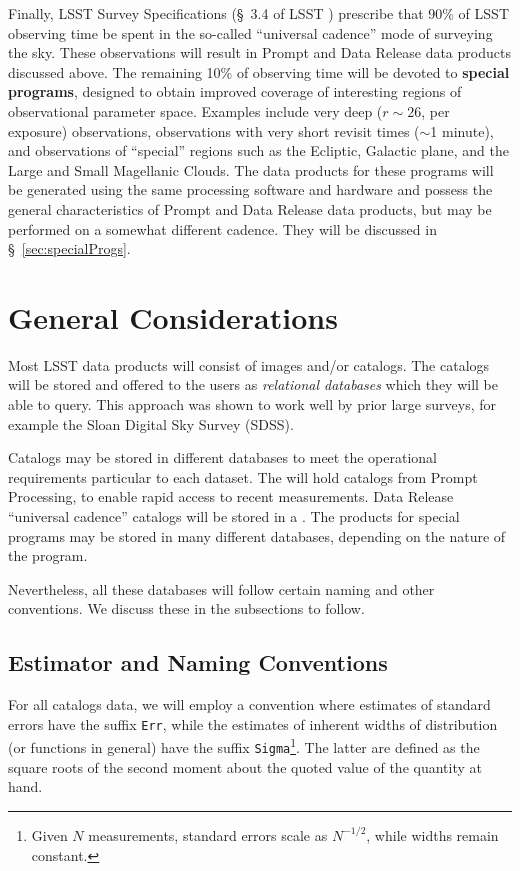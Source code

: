 Finally, LSST Survey Specifications (\S~3.4 of LSST \SRD) prescribe that 90\% of LSST observing time be spent in the so-called ``universal cadence'' mode of surveying the sky. These observations will result in Prompt and Data Release data products discussed above. The remaining 10\% of observing time will be devoted to \textbf{special programs}, designed to obtain improved coverage of interesting regions of observational parameter space. Examples include very deep ($r\sim26$, per exposure) observations, observations with very short revisit times ($\sim$1 minute), and observations of ``special'' regions such as the Ecliptic, Galactic plane, and the Large and Small Magellanic Clouds. The data products for these programs will be generated using the same processing software and hardware and possess the general characteristics of Prompt and Data Release data products, but may be performed on a somewhat different cadence. They will be discussed in \S~\ref{sec:specialProgs}.


\section{General Considerations}

Most LSST data products will consist of images and/or catalogs. The catalogs will be stored and offered to the users as \emph{relational databases} which they will be able to query. This approach was shown to work well by prior large surveys, for example the Sloan Digital Sky Survey (SDSS).

Catalogs may be stored in different databases to meet the operational requirements particular to each dataset. The \PPDB will hold catalogs from Prompt Processing, to enable rapid access to recent measurements.
Data Release ``universal cadence'' catalogs will be stored in a \DR. The products for special programs may be stored in many different databases, depending on the nature of the program.

Nevertheless, all these databases will follow certain naming and other conventions. We discuss these in the subsections to follow.

\subsection{Estimator and Naming Conventions}

For all catalogs data, we will employ a convention where estimates of standard errors have the suffix \texttt{Err}, while the estimates of inherent widths of distribution (or functions in general) have the suffix \texttt{Sigma}\footnote{Given $N$ measurements, standard errors scale as $N^{-1/2}$, while widths remain constant.}. The latter are defined as the square roots of the second moment about the quoted value of the quantity at hand.

